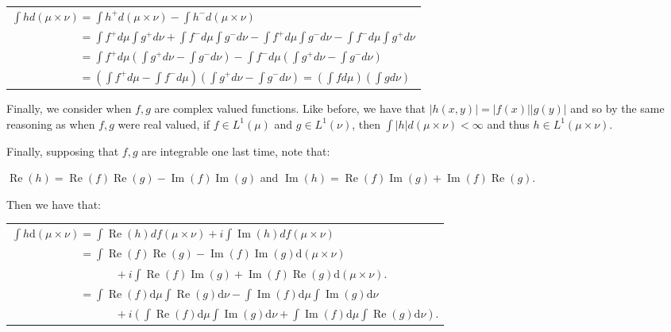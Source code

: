 \documentclass{book}
\newcommand{\exPP}{%
   \color{RedViolet}%
   \fontsize{12}{14}\selectfont%
}
\newenvironment{myIndent}{%
   \begin{adjustwidth}{2.5em}{0em}%
}{%
   \end{adjustwidth}%
}
\newcommand{\df}{\mathrm{d}}
\DeclareMathOperator{\rea}{Re}
\DeclareMathOperator{\ima}{Im}
\newcommand{\retTwo}{\hfill\bigbreak}
\begin{document}
\begin{enumerate}
\begin{myIndent}
		{\centering\exPP
		\begin{tabular}{l}
			 $\int h d(\mu \times \nu) = \int h^+ d(\mu \times \nu) - \int h^- d(\mu \times \nu)$\\ [4pt]

			 $\phantom{\int h d(\mu \times \nu) } = \int f^+ d\mu \int g^+ d\nu + \int f^- d\mu \int g^- d\nu - \int f^+ d\mu \int g^- d\nu - \int f^- d\mu \int g^+ d\nu$\\ [4pt]

			 $\phantom{\int h d(\mu \times \nu) } = \int f^+ d\mu(\int g^+d\nu - \int g^- d\nu) - \int f^-d\mu (\int g^+ d\nu - \int g^- d\nu)$\\ [4pt]

			 $\phantom{\int h d(\mu \times \nu) } = (\int f^+d\mu - \int f^-d\mu)(\int g^+ d\nu - \int g^- d\nu) = (\int fd\mu)(\int gd\nu)$
		\end{tabular}\retTwo\par}

		Finally, we consider when $f, g$ are complex valued functions. Like before, we have that $|h(x, y)| = |f(x)||g(y)|$ and so by the same reasoning as when $f, g$ were real valued, if $f \in L^1(\mu)$ and $g \in L^1(\nu)$, then $\int |h|d(\mu \times \nu) < \infty$ and thus $h \in L^1(\mu \times \nu)$.

		Finally, supposing that $f, g$ are integrable one last time, note that:
		
		{\centering\exPP $\rea(h) = \rea(f)\rea(g) - \ima(f)\ima(g)$ and $\ima(h) = \rea(f)\ima(g) + \ima(f)\rea(g)$.\newpage\par}

		Then we have that:

		{\centering\exPP\begin{tabular}{l}
			$\int h \df(\mu \times \nu) = \int \rea(h) df(\mu \times \nu) + i \int \ima(h) df(\mu \times \nu)$\\ [8pt]

			$\phantom{\int h \df(\mu \times \nu)} = \int \rea(f)\rea(g) - \ima(f)\ima(g) \df (\mu \times \nu)$\\
			$\phantom{\phantom{\int h \df(\mu \times \nu)} aaaaaa} + i \int \rea(f)\ima(g) + \ima(f)\rea(g) \df (\mu \times \nu)$.\\ [8pt]

			$\phantom{\int h \df(\mu \times \nu)} = \int \rea(f)\df \mu \int\rea(g) \df \nu - \int \ima(f)\df \mu \int \ima(g) \df \nu$\\
			$\phantom{\phantom{\int h \df(\mu \times \nu)} aaaaaa} + i (\int \rea(f) \df \mu \int \ima(g) \df \nu + \int \ima(f) \df \mu \int \rea(g) \df \nu)$.\\ [8pt]


\end{tabular}}
\end{myIndent}
\end{enumerate}
\end{document}
